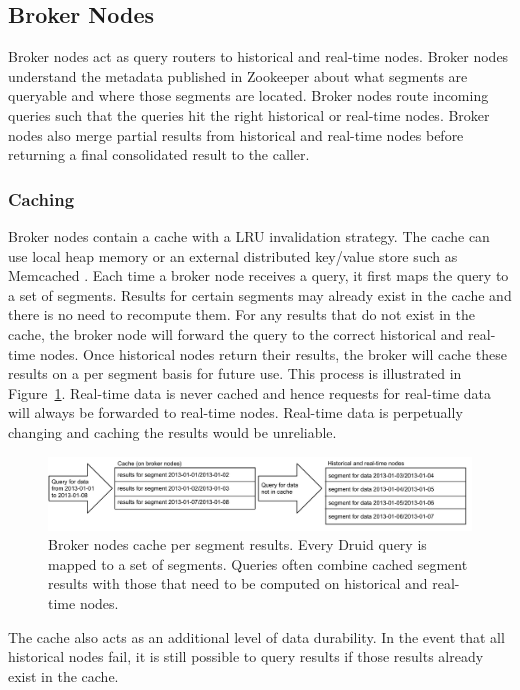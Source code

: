 \documentclass{acm_proc_article-sp}
\begin{document}
\subsection{Broker Nodes}
Broker nodes act as query routers to historical and real-time nodes. Broker
nodes understand the metadata published in Zookeeper about what segments are
queryable and where those segments are located. Broker nodes route incoming queries
such that the queries hit the right historical or real-time nodes. Broker nodes
also merge partial results from historical and real-time nodes before returning
a final consolidated result to the caller.  

\subsubsection{Caching}
\label{sec:caching}
Broker nodes contain a cache with a LRU \cite{o1993lru, kim2001lrfu}
invalidation strategy. The cache can use local heap memory or an external
distributed key/value store such as Memcached
\cite{fitzpatrick2004distributed}. Each time a broker node receives a query, it
first maps the query to a set of segments. Results for certain segments may
already exist in the cache and there is no need to recompute them. For any
results that do not exist in the cache, the broker node will forward the query
to the correct historical and real-time nodes.  Once historical nodes return
their results, the broker will cache these results on a per segment basis for
future use. This process is illustrated in Figure~\ref{fig:caching}. Real-time
data is never cached and hence requests for real-time data will always be
forwarded to real-time nodes.  Real-time data is perpetually changing and
caching the results would be unreliable.

\begin{figure}
\centering
\includegraphics[width = 4.5in]{caching}
\caption{Broker nodes cache per segment results. Every Druid query is mapped to
a set of segments. Queries often combine cached segment results with those that
need to be computed on historical and real-time nodes.}
\label{fig:caching}
\end{figure}

The cache also acts as an additional level of data durability. In the event
that all historical nodes fail, it is still possible to query results if those
results already exist in the cache.
\end{document}
